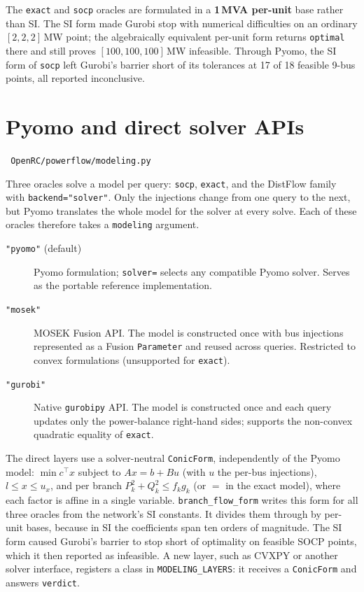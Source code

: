 \documentclass[11pt,a4paper]{report}
\newcommand{\why}[1]{\par\medskip\begingroup\noindent #1\par\endgroup\medskip}
\newcommand{\code}[1]{\texttt{\small #1}}
\newcommand{\file}[1]{\texttt{\small\color{nbgrey} #1}}
\begin{document}
\why{The \code{exact} and \code{socp} oracles are formulated in a
\textbf{1\,MVA per-unit} base rather than SI. The SI form made Gurobi stop with
numerical difficulties on an ordinary $[2,2,2]$\,MW point; the algebraically
equivalent per-unit form returns \code{optimal} there and still proves
$[100,100,100]$\,MW infeasible. Through Pyomo, the SI form of \code{socp} left
Gurobi's barrier short of its tolerances at 17 of 18 feasible 9-bus points,
all reported inconclusive.}

\section{Pyomo and direct solver APIs}
\label{sec:modeling}

\file{OpenRC/powerflow/modeling.py}

Three oracles solve a model per query: \code{socp}, \code{exact}, and the
DistFlow family with \code{backend="solver"}. Only the injections change from
one query to the next, but Pyomo translates the whole model for the solver at
every solve. Each of these oracles therefore takes a \code{modeling} argument.

\begin{description}
\item[\code{"pyomo"} (default)] Pyomo formulation; \code{solver=} selects any
  compatible Pyomo solver. Serves as the portable reference implementation.
\item[\code{"mosek"}] MOSEK Fusion API. The model is constructed once with bus
  injections represented as a Fusion \code{Parameter} and reused across
  queries. Restricted to convex formulations (unsupported for \code{exact}).
\item[\code{"gurobi"}] Native \code{gurobipy} API. The model is constructed
  once and each query updates only the power-balance right-hand sides;
  supports the non-convex quadratic equality of \code{exact}.
\end{description}

The direct layers use a solver-neutral \code{ConicForm}, independently of the
Pyomo model:
$\min c^\top x$ subject to $Ax = b + Bu$ (with $u$ the per-bus injections),
$l \le x \le u_x$, and per branch $P_k^2 + Q_k^2 \le f_k g_k$ (or $=$ in the
exact model), where each factor is affine in a single variable.
\code{branch\_flow\_form} writes this form for all three oracles from the
network's SI constants. It divides them through by per-unit bases,
because in SI the coefficients span ten orders of magnitude. The SI form
caused Gurobi's barrier to stop short of optimality on feasible SOCP points,
which it then reported as infeasible. A new layer, such as CVXPY or another
solver interface, registers a class in \code{MODELING\_LAYERS}: it receives a
\code{ConicForm} and answers \code{verdict}.
\end{document}
